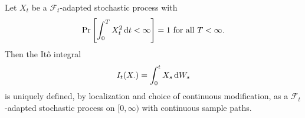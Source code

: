 \begin{fdef}[It\^{o} Integral]
	Let $X_t$ be a $\mathcal{F}_t$-adapted stochastic process with
	\[ \Pr\left[\int_0^T X_t^2\operatorname{d}\!{t} < \infty\right] = 1 \text{ for all } T<\infty. \]
	Then the It\^{o} integral
	\[ I_t(X_\cdot) = \int_0^t X_s\operatorname{d}\!{W}_s \]
	is uniquely defined, by localization and choice of continuous modification, as a $\mathcal{F}_t$-adapted stochastic process on $[0,\infty)$ with continuous sample paths.
\end{fdef}